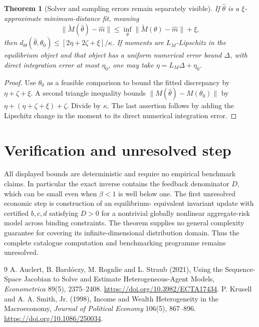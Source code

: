 \documentclass[11pt]{article}
\newtheorem{theorem}{Theorem}
\theoremstyle{remark}
\begin{document}
\begin{theorem}[Solver and sampling errors remain separately visible]
If $\widehat\theta$ is a $\xi$-approximate minimum-distance fit, meaning
\[
 \|\widetilde M(\widehat\theta)-\widehat m\|
 \leq\inf_\theta\|\widetilde M(\theta)-\widehat m\|+\xi,
\]
then
$d_\Theta(\widehat\theta,\theta_0)\leq
 [2\eta+2\zeta+\xi]/\kappa$.
If moments are $L_M$-Lipschitz in the equilibrium object and that object
has a uniform numerical error bound $\Delta$, with direct integration
error at most $\eta_0$, one may take $\eta=L_M\Delta+\eta_0$.
\end{theorem}
\begin{proof}
Use $\theta_0$ as a feasible comparison to bound the fitted discrepancy
by $\eta+\zeta+\xi$. A second triangle inequality bounds
$\|M(\widehat\theta)-M(\theta_0)\|$ by
$\eta+(\eta+\zeta+\xi)+\zeta$. Divide by $\kappa$.
The last assertion follows by adding the Lipschitz change in the moment
to its direct numerical integration error.
\end{proof}

\section{Verification and unresolved step}
All displayed bounds are deterministic and require no empirical
benchmark claims. In particular the exact inverse contains the feedback
denominator $D$, which can be small even when $\beta<1$ is well below one.
The first unresolved economic step is construction of an equilibrium-
equivalent invariant update with certified $b,c,d$ satisfying $D>0$ for a
nontrivial globally nonlinear aggregate-risk model across binding
constraints. The theorem supplies no general complexity guarantee for
covering its infinite-dimensional distribution domain. Thus the complete
catalogue computation and benchmarking programme remains unresolved.

\begin{thebibliography}{9}
 A. Auclert, B. Bard\'oczy, M. Rognlie and L. Straub (2021),
Using the Sequence-Space Jacobian to Solve and Estimate Heterogeneous-Agent
Models, \emph{Econometrica} 89(5), 2375--2408.
\url{https://doi.org/10.3982/ECTA17434}.
 P. Krusell and A. A. Smith, Jr. (1998), Income and Wealth
Heterogeneity in the Macroeconomy, \emph{Journal of Political Economy}
106(5), 867--896. \url{https://doi.org/10.1086/250034}.
\end{thebibliography}
\end{document}
